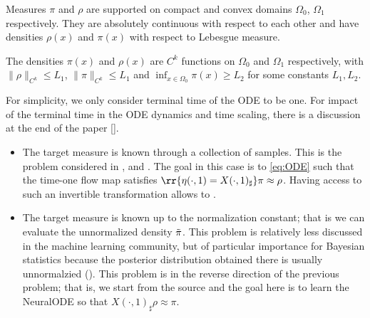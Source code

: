 \begin{assumption}\label{AssumptionDensity1}
Measures $\pi$ and $\rho$ are supported on compact and convex domains $\Omega_0$, $\Omega_1$ respectively. They are absolutely continuous with respect to each other  
and have densities $\rho(x)$ and $\pi(x)$ with respect to Lebesgue measure. 

\begin{assumption}\label{AssumptionDensity2}
The densities $\pi(x)$ and $\rho(x)$ are $C^k$ functions on $\Omega_0$ and $\Omega_1$ respectively, with $\|\rho\|_{C^k} \leq L_1$, $\|\pi\|_{C^k} \leq L_1$ and $\inf_{x\in\Omega_0}\pi(x) \geq L_2$ for some constants $L_1, L_2$.
\end{assumption}


\end{assumption}

For simplicity, we only consider terminal time of the ODE to be one. For
impact of the terminal time in the ODE dynamics and time scaling,
there is a discussion at the end of the paper \ref{}.

\begin{itemize}
    \item The target measure \jz{$\pi$} is known through a collection of  samples. This is the problem considered in \cite{ffjord}, \cite{HowToTrain} and \cite{OTFlow}. The goal in this case is to   \eqref{eq:ODE} such that the time-one flow map satisfies $\rr{\eta(\cdot, 1) = X(\cdot,1)_\sharp}\pi\approx\rho$. Having access to such an invertible transformation allows  to . 
    \item The target measure is known up to the normalization constant; that is we can evaluate the unnormalized density $\Tilde{\pi}$. This problem is relatively less discussed in the machine learning community,  but of particular importance for Bayesian statistics because the posterior distribution obtained there is usually unnormalzied (\cite{measure-transport}). This problem is in the reverse direction of the previous problem; that is, we start from the source and the goal here is to learn the NeuralODE so that $X(\cdot,1)_\sharp\rho\approx\pi$. 
    
\end{itemize}








